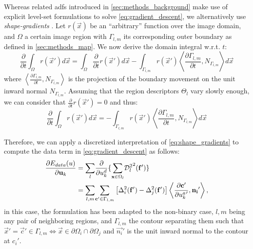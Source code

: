 Whereas related \glspl*{adf} introduced in \autoref{sec:methods_background}
make use of explicit level-set formulations to solve \eqref{eq:gradient_descent},
we alternatively use \emph{shape-gradients}
\cite{jehan-besson_dream2s:_2003,herbulot_segmentation_2006}.
Let $r(\vec{x})$ be an ``arbitrary'' function over the image domain,
and $\Omega$ a certain image region with $\Gamma_{l,m}$ its corresponding
outer boundary as defined in \autoref{sec:methods_map}.
We now derive the domain integral w.r.t. $t$:
\begin{equation*}
\frac{\partial}{\partial t} \int_\Omega r(\vec{x}') d\vec{x} = \int_\Omega \frac{\partial}{\partial t}r(\vec{x}') d\vec{x} - \int_{\Gamma_{l,m}} r(\vec{x}') \left\langle \frac{\partial \Gamma_{l,m} }{\partial t}, N_{\Gamma_{l,m}}\right\rangle d\vec{x}
\end{equation*}
where $\left\langle\frac{\partial\Gamma_{l,m}}{\partial t}, N_{\Gamma_{l,m}}\right\rangle$ is 
the projection of the boundary movement on the unit inward normal $N_{\Gamma_{l,m}}$. Assuming
that the region descriptors $\Theta_l$ vary slowly enough, we can consider
that $\frac{\partial}{\partial t} r(\vec{x}') = 0$ and thus:
\begin{equation}
\frac{\partial}{\partial t} \int_\Omega r(\vec{x}') d\vec{x} = 
- \int_{\Gamma_{l,m}} r(\vec{x}') \left\langle \frac{\partial \Gamma_{l,m} }{\partial t}, N_{\Gamma_{l,m}}\right\rangle d\vec{x}
\label{eq:shape_gradients}
\end{equation}

Therefore, we can apply a discretized interpretation of \eqref{eq:shape_gradients}
to compute the data term in \eqref{eq:gradient_descent} as follows:
\begin{align}
\frac{\partial E_{data}(u)}{\partial \vec{u}_k} &=
\underset{l}{\sum} \frac{ \partial }{\partial u^d_k} \lbrace
 \underset{\vec{x} \in \Omega_l}{\sum}
{\mathcal{D}_l^2}^2 (\vec{f}') \rbrace \notag\\
&= \underset{l,m}{\sum} \underset{\vec{c}' \in \Gamma_{l,m}}{\sum}
\left[ \Delta^2_i (\vec{f}' ) - \Delta^2_j (\vec{f}')\right]
\left\langle \frac{\partial \vec{c}'}{\partial {u^a_k}'}, \vec{n_i}'\right\rangle,
\label{eq:gradient_wshape}
\end{align}
in this case, the formulation has been adapted to the non-binary case, $l,m$
being any pair of neighboring regions, and $\Gamma_{l,m}$ the contour separating
them such that $\vec{x}' = \vec{c}' \in\Gamma_{l,m} \iff \vec{x}\in \partial\Omega_i \cap \partial\Omega_j$
and $\vec{n_i}'$ is the unit inward normal to the contour at $c_i'$.

